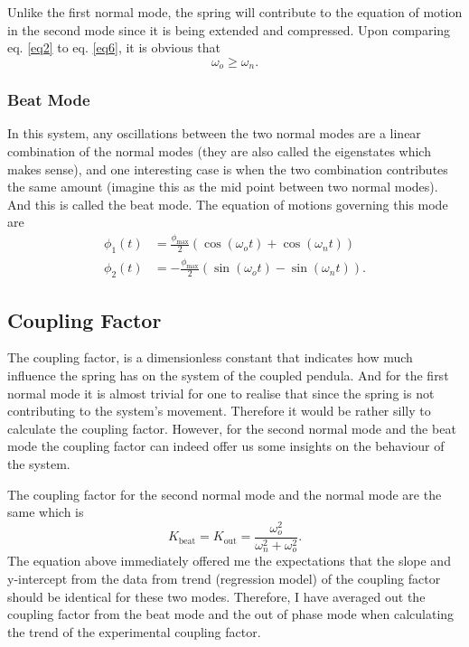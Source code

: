 \documentclass[aps,prl,reprint,10pt,amsmath,amssymb,superscriptaddress,a4paper]{revtex4-2}
\begin{document}
Unlike the first normal mode, the spring will contribute to the equation of motion in the second mode since it is being extended and compressed. Upon comparing eq. \ref{eq2} to eq. \ref{eq6}, it is obvious that 
$$\omega_o \ge \omega_n.$$

\subsubsection{Beat Mode}
In this system, any oscillations between the two normal modes are a linear combination of the normal modes (they are also called the eigenstates which makes sense), and one interesting case is when the two combination contributes the same amount (imagine this as the mid point between two normal modes). And this is called the beat mode. The equation of motions governing this mode are 
\begin{align}
    \phi_1(t) &= \frac{\phi_{\text{max}}}{2} (\cos(\omega_o t) + \cos(\omega_n t))\\
    \phi_2(t) &= -\frac{\phi_{\text{max}}}{2} (\sin(\omega_o t) - \sin(\omega_n t)).
\end{align}
\subsection{Coupling Factor}
The coupling factor, is a dimensionless constant that indicates how much influence the spring has on the system of the coupled pendula. And for the first normal mode it is almost trivial for one to realise that since the spring is not contributing to the system's movement. Therefore it would be rather silly to calculate the coupling factor. However, for the second normal mode and the beat mode the coupling factor can indeed offer us some insights on the behaviour of the system. 

The coupling factor for the second normal mode \cite{noauthor_coupled_nodate} and the normal mode are the same which is
\begin{equation}
    K_{\text{beat}} = K_{\text{out}} = \frac{\omega_o^2}{\omega_n^2+\omega_o^2}.
\end{equation}
The equation above immediately offered me the expectations that the slope and y-intercept from the data from trend (regression model) of the coupling factor should be identical for these two modes. Therefore, I have averaged out the coupling factor from the beat mode and the out of phase mode when calculating the trend of the experimental coupling factor.
\end{document}
